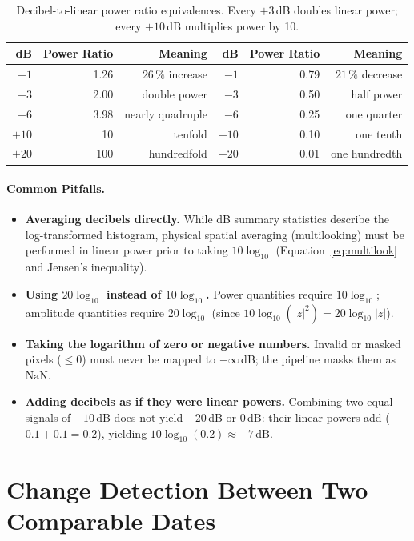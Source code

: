 \documentclass[11pt,a4paper]{article}
\begin{document}
\begin{table}[htbp]
\centering\small
\begin{tabular}{rrr|rrr}
\toprule
dB & Power Ratio & Meaning & dB & Power Ratio & Meaning\\\midrule
$+1$ & 1.26 & $26\,\%$ increase & $-1$ & 0.79 & $21\,\%$ decrease\\
$+3$ & 2.00 & double power & $-3$ & 0.50 & half power\\
$+6$ & 3.98 & nearly quadruple & $-6$ & 0.25 & one quarter\\
$+10$ & 10 & tenfold & $-10$ & 0.10 & one tenth\\
$+20$ & 100 & hundredfold & $-20$ & 0.01 & one hundredth\\\bottomrule
\end{tabular}
\caption{Decibel-to-linear power ratio equivalences. Every $+3$\,dB doubles linear power; every $+10$\,dB multiplies power by 10.}
\label{tab:db-razon}
\end{table}

\paragraph{Common Pitfalls.}
\begin{itemize}
  \item \textbf{Averaging decibels directly.} While dB summary statistics describe the log-transformed histogram, physical spatial averaging (multilooking) must be performed in linear power prior to taking $10\log_{10}$ (Equation~\eqref{eq:multilook} and Jensen's inequality).
  \item \textbf{Using $20\log_{10}$ instead of $10\log_{10}$.} Power quantities require $10\log_{10}$; amplitude quantities require $20\log_{10}$ (since $10\log_{10}(|z|^2) = 20\log_{10}|z|$).
  \item \textbf{Taking the logarithm of zero or negative numbers.} Invalid or masked pixels ($\le 0$) must never be mapped to $-\infty$\,dB; the pipeline masks them as $\mathrm{NaN}$.
  \item \textbf{Adding decibels as if they were linear powers.} Combining two equal signals of $-10$\,dB does not yield $-20$\,dB or $0$\,dB: their linear powers add ($0.1+0.1=0.2$), yielding $10\log_{10}(0.2) \approx -7$\,dB.
\end{itemize}

\section{Change Detection Between Two Comparable Dates}
\label{sec:cambio}
\end{document}
